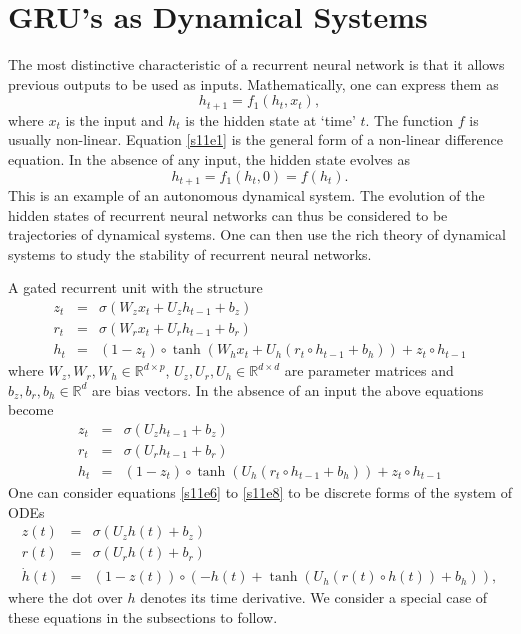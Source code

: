 \documentclass{article}
\numberwithin{equation}{section}
\begin{document}
\section{GRU's as Dynamical Systems}\label{s11}
The most distinctive characteristic of a recurrent neural network is that it
allows previous outputs to be used as inputs. Mathematically, one can express
them as
\begin{equation}\label{s11e1}
h_{t+1} = f_1(h_t, x_t),
\end{equation}
where $x_t$ is the input and $h_t$ is the hidden state at `time' $t$. The
function $f$ is usually non-linear. Equation \eqref{s11e1} is the general form
of a non-linear difference equation. In the absence of any input, the hidden
state evolves as
\begin{equation}\label{s11e2}
h_{t+1} = f_1(h_t, 0) = f(h_t).
\end{equation}
This is an example of an autonomous dynamical system. The evolution of the
hidden states of recurrent neural networks can thus be considered to be
trajectories of dynamical systems. One can then use the rich theory of 
dynamical systems to study the stability of recurrent neural networks.

A gated recurrent unit with the structure
\begin{eqnarray}
z_t &=& \sigma(W_zx_t + U_zh_{t-1} + b_z) \label{s11e3} \\
r_t &=& \sigma(W_rx_t + U_rh_{t-1} + b_r) \label{s11e4} \\
h_t &=& (1 - z_t)\circ\tanh(W_hx_t + U_h(r_t\circ h_{t-1} + b_h)) + 
        z_t \circ h_{t-1} \label{s11e5}
\end{eqnarray}
where $W_z, W_r, W_h \in \mathbb{R}^{d \times p}$, $U_z, U_r, U_h \in 
\mathbb{R}^{d \times d}$ are parameter matrices and  $b_z, b_r, b_h \in
\mathbb{R}^d$ are bias vectors. In the absence of an input the above
equations become
\begin{eqnarray}
z_t &=& \sigma(U_zh_{t-1} + b_z) \label{s11e6} \\
r_t &=& \sigma(U_rh_{t-1} + b_r) \label{s11e7} \\
h_t &=& (1 - z_t)\circ\tanh(U_h(r_t\circ h_{t-1} + b_h)) + 
        z_t \circ h_{t-1} \label{s11e8}
\end{eqnarray}
One can consider equations \eqref{s11e6} to \eqref{s11e8} to be discrete
forms of the system of ODEs \cite{jordan2019gated}
\begin{eqnarray}
z(t) &=& \sigma(U_zh(t) + b_z) \label{s11e9} \\
r(t) &=& \sigma(U_rh(t) + b_r) \label{s11e10} \\
\dot{h}(t) &=& (1 - z(t))\circ
	\left(-h(t)+\tanh(U_h(r(t)\circ h(t)) + b_h)\right) \label{s11e11},
\end{eqnarray}
where the dot over $h$ denotes its time derivative. We consider a special case
of these equations in the subsections to follow.
\end{document}
